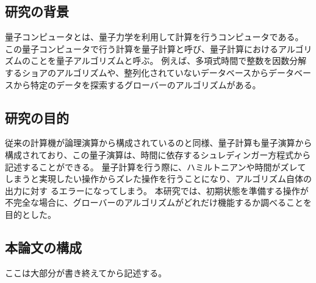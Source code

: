 \begin{comment}
    はじめに
\end{comment}


% 

\subsection{研究の背景}
量子コンピュータとは、量子力学を利用して計算を行うコンピュータである。
この量子コンピュータで行う計算を量子計算と呼び、量子計算におけるアルゴリズムのことを量子アルゴリズムと呼ぶ。
例えば、多項式時間で整数を因数分解するショアのアルゴリズムや、整列化されていないデータベースからデータベースから特定のデータを探索するグローバーのアルゴリズムがある。


\subsection{研究の目的}
従来の計算機が論理演算から構成されているのと同様、量子計算も量子演算から構成されており、この量子演算は、時間に依存するシュレディンガー方程式から記述することができる。
量子計算を行う際に、ハミルトニアンや時間がズレてしまうと実現したい操作からズレた操作を行うことになり、アルゴリズム自体の出力に対す るエラーになってしまう。
本研究では、初期状態を準備する操作が不完全な場合に、グローバーのアルゴリズムがどれだけ機能するか調べることを目的とした。
\subsection{本論文の構成}
ここは大部分が書き終えてから記述する。
